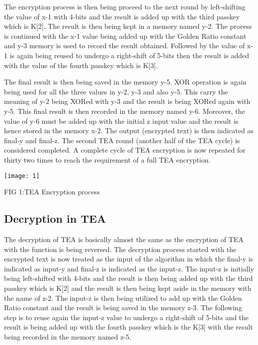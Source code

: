 \documentclass[letterpaper, 12 pt, conference]{ieeeconf}  %
\begin{document}
The encryption process is then being proceed to the next round by left-shifting the value of x-1 with 4-bits and the result is added up with the third passkey which is K[2]. The result is then being kept in a memory named y-2. The process is continued with the x-1 value being added up with the Golden Ratio constant and y-3 memory is used to record the result obtained. Followed by the value of x-1 is again being reused to undergo a right-shift of 5-bits then the result is added with the value of the fourth passkey which is K[3].
  
  The final result is then being saved in the memory y-5. XOR operation is again being used for all the three values in y-2, y-3 and also y-5. This carry the meaning of y-2 being XORed with y-3 and the result is being XORed again with y-5. This final result is then recorded in the memory named y-6.
Moreover, the value of y-6 must be added up with the initial z input value and the result is hence stored in the memory x-2. The output (encrypted text) is then indicated as final-y and final-z. The second TEA round (another half of the TEA cycle) is considered completed. A complete cycle of TEA encryption is now repeated for thirty two times to reach the requirement of a full TEA encryption. 

\texttt{[image: 1]}

FIG 1:TEA Encryption process
\subsection{Decryption in TEA}
 The decryption of TEA is basically almost the same as the encryption of TEA with the function is being reversed. The decryption process started with the encrypted text is now treated as the input of the algorithm in which the final-y is indicated as input-y and final-z is indicated as the input-z. The input-z is initially being left-shifted with 4-bits and the result is then being added up with the third passkey which is K[2] and the result is then being kept aside in the memory with the name of z-2. The input-z is then being utilized to add up with the Golden Ratio constant and the result is being saved in the memory z-3. The following step is to reuse again the input-z value to undergo a right-shift of 5-bits and the result is being added up with the fourth passkey which is the K[3] with the result being recorded in the memory named z-5.
\end{document}
